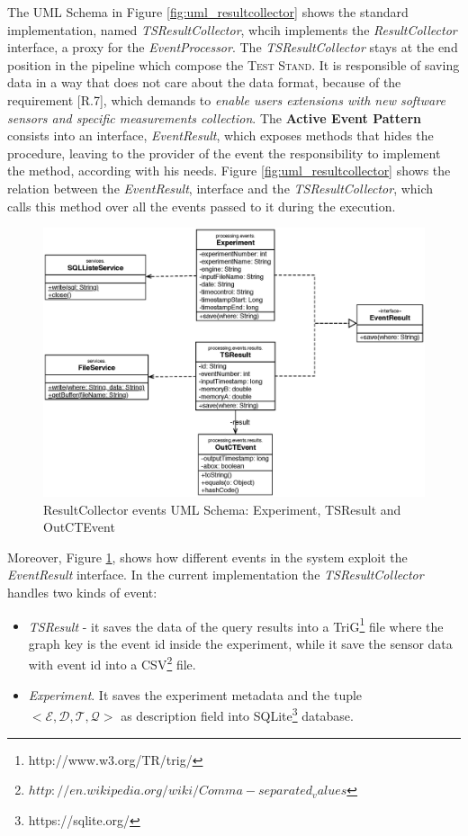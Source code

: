 The UML Schema in Figure \ref{fig:uml_resultcollector} shows the standard implementation, named \textit{TSResultCollector}, whcih implements the \textit{ResultCollector} interface, a proxy for the \textit{EventProcessor}. The \textit{TSResultCollector} stays at the end position in the pipeline which compose the \textsc{Test Stand}. It is responsible of saving data  in a way that does not care about the data format, because of the requirement [R.7], which demands to \textit{enable users extensions with new software sensors and specific measurements collection}. The \textbf{Active Event Pattern} consists into an interface, \textit{EventResult}, which exposes methods that hides the procedure, leaving to the provider of the event the responsibility to implement the method, according with his needs. Figure \ref{fig:uml_resultcollector} shows the relation between the  \textit{EventResult}, interface and the \textit{TSResultCollector}, which calls this method over all the events passed to it during the execution. 


\begin{figure}[tbh]
  \centering
	\includegraphics[width=\linewidth]{images/uml_resultcollector_events}
	\caption{ResultCollector events  UML Schema: Experiment, TSResult and OutCTEvent} 
  	\label{fig:uml_resultcollector_events}
\end{figure}

Moreover, Figure \ref{fig:uml_resultcollector_events}, shows how different events in the system exploit the \textit{EventResult} interface. In the current implementation the \textit{TSResultCollector} handles two kinds of event:
\begin{itemize}
\item \textit{TSResult} - it saves the data of the query results into a TriG\footnote{http://www.w3.org/TR/trig/} file where the graph key is the event id inside the experiment, while it save the sensor data with event id into a CSV\footnote{$http://en.wikipedia.org/wiki/Comma-separated_values$} file. 
\item \textit{Experiment}. It saves the experiment metadata and the tuple \\ $<\mathcal{E},\mathcal{D},\mathcal{T},\mathcal{Q}>$ as description field into SQLite\footnote{https://sqlite.org/} database.
\end{itemize} 

